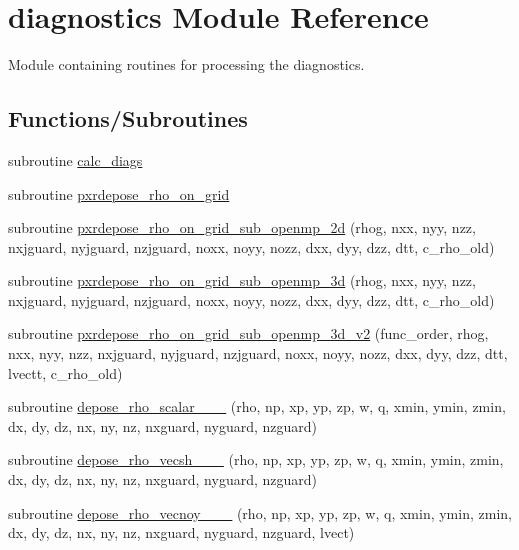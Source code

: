 \hypertarget{namespacediagnostics}{}\section{diagnostics Module Reference}
\label{namespacediagnostics}


Module containing routines for processing the diagnostics.  


\subsection*{Functions/\+Subroutines}
\begin{DoxyCompactItemize}
\item 
subroutine \hyperlink{namespacediagnostics_ae7171376e1d30d3465491f0f75a39180}{calc\+\_\+diags}
\item 
subroutine \hyperlink{namespacediagnostics_a8d8c31da5108571fdd3224cd692cf61a}{pxrdepose\+\_\+rho\+\_\+on\+\_\+grid}
\item 
subroutine \hyperlink{namespacediagnostics_a13a5047b07a130b8790d9240f55d5f50}{pxrdepose\+\_\+rho\+\_\+on\+\_\+grid\+\_\+sub\+\_\+openmp\+\_\+2d} (rhog, nxx, nyy, nzz, nxjguard, nyjguard, nzjguard, noxx, noyy, nozz, dxx, dyy, dzz, dtt, c\+\_\+rho\+\_\+old)
\item 
subroutine \hyperlink{namespacediagnostics_a71e49f591ad529271f68450170310c6a}{pxrdepose\+\_\+rho\+\_\+on\+\_\+grid\+\_\+sub\+\_\+openmp\+\_\+3d} (rhog, nxx, nyy, nzz, nxjguard, nyjguard, nzjguard, noxx, noyy, nozz, dxx, dyy, dzz, dtt, c\+\_\+rho\+\_\+old)
\item 
subroutine \hyperlink{namespacediagnostics_ab9048ee1e174ef107883875a0f750305}{pxrdepose\+\_\+rho\+\_\+on\+\_\+grid\+\_\+sub\+\_\+openmp\+\_\+3d\+\_\+v2} (func\+\_\+order, rhog, nxx, nyy, nzz, nxjguard, nyjguard, nzjguard, noxx, noyy, nozz, dxx, dyy, dzz, dtt, lvectt, c\+\_\+rho\+\_\+old)
\item 
subroutine \hyperlink{namespacediagnostics_a8c121f68d09e968d4a5c74811759b0f5}{depose\+\_\+rho\+\_\+scalar\+\_\+\_\+\_} (rho, np, xp, yp, zp, w, q, xmin, ymin, zmin, dx, dy, dz, nx, ny, nz, nxguard, nyguard, nzguard)
\item 
subroutine \hyperlink{namespacediagnostics_af2af5ba421e1e51c0bf4851aa5f4f387}{depose\+\_\+rho\+\_\+vecsh\+\_\+\_\+\_} (rho, np, xp, yp, zp, w, q, xmin, ymin, zmin, dx, dy, dz, nx, ny, nz, nxguard, nyguard, nzguard)
\item 
subroutine \hyperlink{namespacediagnostics_a5c6c3ca3305fe114983561316d733fc6}{depose\+\_\+rho\+\_\+vecnoy\+\_\+\_\+\_} (rho, np, xp, yp, zp, w, q, xmin, ymin, zmin, dx, dy, dz, nx, ny, nz, nxguard, nyguard, nzguard, lvect)

\end{DoxyCompactItemize}
